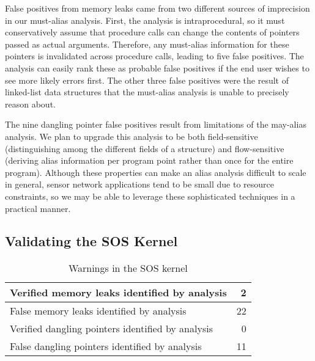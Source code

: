 \smallskip{}



False positives from memory leaks came from two different sources of
imprecision in our must-alias analysis.
%
First, the analysis is intraprocedural, so it must conservatively assume
that procedure calls can change the contents of pointers passed as
actual arguments.  
%
Therefore, any must-alias information for these pointers is invalidated
across procedure calls, leading to five false positives.
%
The analysis can easily rank these as probable false positives if the
end user wishes to see more likely errors first.  
%
The other three false positives were the result of linked-list data
structures that the must-alias analysis is unable to precisely reason
about.  



\smallskip{}



The nine dangling pointer false positives result from limitations of the
may-alias analysis.  
%
We plan to upgrade this analysis to be both field-sensitive
(distinguishing among the different fields of a structure) and
flow-sensitive (deriving alias information per program point rather than
once for the entire program).  
%
Although these properties can make an alias analysis difficult to scale
in general, sensor network applications tend to be small due to resource
constraints, so we may be able to leverage these sophisticated
techniques in a practical manner.


\subsection{Validating the SOS Kernel}



\begin{table}
\caption{Warnings in the SOS kernel}
%
\label{tab:kernel}
\centering 
\begin{tabular}{| l | r |}
    \hline 
    Verified memory leaks identified by analysis & 2 \\
    \hline
    False memory leaks identified by analysis & 22 \\
    \hline 
    Verified dangling pointers identified by analysis & 0 \\
    \hline 
    False dangling pointers identified by analysis & 11 \\
    \hline 
\end{tabular} 
%
\end{table}


